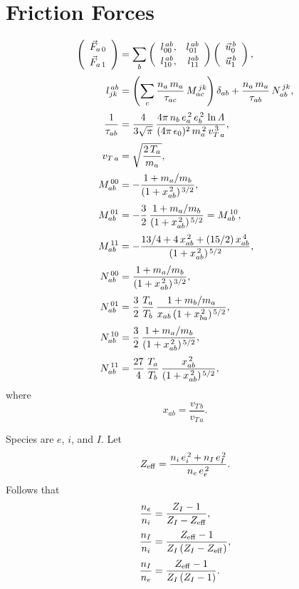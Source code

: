 \documentclass[12pt]{article}
\begin{document}
\section{Friction Forces}
\begin{align}
\left(\begin{array}{c}\vec{F}_{a\,0}\\[0.5ex]\vec{F}_{a\,1}\end{array}\right)&=\sum_b\left(
\begin{array}{rr} l_{00}^{\,ab},&l_{01}^{\,ab}\\[0.5ex]
l_{10}^{\,ab},&l_{11}^{ab}\end{array}\right)\left(\begin{array}{c}\vec{ u}_{0}^{\,b}\\[0.5ex]\vec{u}_{1}^{\,b}\end{array}\right),\\[0.5ex]
l_{jk}^{\,ab}&= \left(\sum_c \frac{n_a\,m_a}{\tau_{ac}}\,M_{ac}^{\,jk}\right)\delta_{ab} +\frac{n_a\,m_a}{\tau_{ab}}\,N_{ab}^{\,jk},\\[0.5ex]
\frac{1}{\tau_{ab}} &= \frac{4}{3\sqrt{\pi}}\,\frac{4\pi\,n_b\,e_a^{\,2}\,e_b^{\,2}\,\ln{\mit\Lambda}}{(4\pi\,\epsilon_0)^2 \,m_a^{\,2}\,v_{T\,a}^{\,3}},\\[0.5ex]
v_{T\,a} &= \sqrt{\frac{2\,T_a}{m_a}},\\[0.5ex]
M_{ab}^{\,00} &= -\frac{1+m_a/m_b}{(1+x_{ab}^{\,2})^{\,3/2}},\\[0.5ex]
M_{ab}^{\,01}&= -\frac{3}{2}\,\frac{1+m_a/m_b}{(1+x_{ab}^{\,2})^{\,5/2}}= M_{ab}^{\,10},\\[0.5ex]
M_{ab}^{\,11}& = -\frac{13/4 + 4\,x_{ab}^{\,2} + (15/2)\,x_{ab}^{\,4}}{(1+x_{ab}^{\,2})^{\,5/2}},\\[0.5ex]
N_{ab}^{\,00} &= \frac{1+m_a/m_b}{(1+x_{ab}^{\,2})^{\,3/2}},\\[0.5ex]
N_{ab}^{\,01}&= \frac{3}{2}\,\frac{T_a}{T_b}\,\frac{1+m_b/m_a}{x_{ab}\,(1+x_{ba}^{\,2})^{\,5/2}},\\[0.5ex]
N_{ab}^{\,10}&= \frac{3}{2}\,\frac{1+m_a/m_b}{(1+x_{ab}^{\,2})^{\,5/2}},\\[0.5ex]
N_{ab}^{\,11}& =\frac{27}{4}\,\frac{T_a}{T_b}\,\frac{x_{ab}^{\,2}}{(1+x_{ab}^{\,2})^{\,5/2}},
\end{align}
where 
\begin{equation}
x_{ab}=\frac{v_{T\,b}}{v_{T\,a}}.
\end{equation} 

Species are $e$, $i$, and $I$. Let 
\begin{equation}
Z_{\rm eff}= \frac{n_i\,e_i^{\,2}+n_I\,e_I^{\,2}}{n_e\,e_e^{\,2}}.
\end{equation} 
Follows that
\begin{align}
\frac{n_e}{n_i} &= \frac{Z_I-1}{Z_I-Z_{\rm eff}},\\[0.5ex]
\frac{n_I}{n_i} &=\frac{Z_{\rm eff}-1}{Z_I\,(Z_I-Z_{\rm eff})},\\[0.5ex]
\frac{n_I}{n_e} &= \frac{Z_{\rm eff}-1}{Z_I\,(Z_I-1)}.
\end{align}
\end{document}
